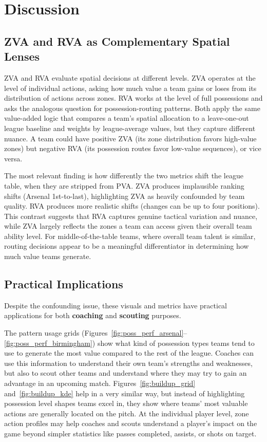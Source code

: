 \documentclass[12pt,a4paper]{article}
\begin{document}
\section{Discussion}

\subsection{ZVA and RVA as Complementary Spatial Lenses}

ZVA and RVA evaluate spatial decisions at different levels. ZVA operates at the level of individual actions, asking how much value a team gains or loses from its distribution of actions across zones. RVA works at the level of full possessions and asks the analogous question for possession-routing patterns. Both apply the same value-added logic that compares a team's spatial allocation to a leave-one-out league baseline and weights by league-average values, but they capture different nuance. A team could have positive ZVA (its zone distribution favors high-value zones) but negative RVA (its possession routes favor low-value sequences), or vice versa.

The most relevant finding is how differently the two metrics shift the league table, when they are stripped from PVA. ZVA produces implausible ranking shifts (Arsenal 1st-to-last), highlighting ZVA as heavily confounded by team quality. RVA produces more realistic shifts (changes can be up to four positions). This contrast suggests that RVA captures genuine tactical variation and nuance, while ZVA largely reflects the zones a team can access given their overall team ability level. For middle-of-the-table teams, where overall team talent is similar, routing decisions appear to be a meaningful differentiator in determining how much value teams generate.

\subsection{Practical Implications}

Despite the confounding issue, these visuals and metrics have practical applications for both \textbf{coaching} and \textbf{scouting} purposes.

The pattern usage grids (Figures~\ref{fig:poss_perf_arsenal}--\ref{fig:poss_perf_birmingham}) show what kind of possession types teams tend to use to generate the most value compared to the rest of the league. Coaches can use this information to understand their own team's strengths and weaknesses, but also to scout other teams and understand where they may try to gain an advantage in an upcoming match. Figures~\ref{fig:buildup_grid} and~\ref{fig:buildup_kde} help in a very similar way, but instead of highlighting possession level shapes teams excel in, they show where teams' most valuable actions are generally located on the pitch. At the individual player level, zone action profiles may help coaches and scouts understand a player's impact on the game beyond simpler statistics like passes completed, assists, or shots on target.
\end{document}
